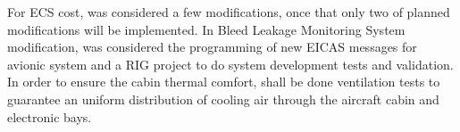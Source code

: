 For ECS cost, was considered a few modifications, once that only two of planned modifications will be implemented.
In Bleed Leakage Monitoring System modification, was considered the programming of new EICAS messages for avionic system and a RIG project to do system development tests and validation.
In order to ensure the cabin thermal comfort, shall be done ventilation tests to guarantee an uniform distribution of cooling air through the aircraft cabin and electronic bays.
\begin{figure}[H] %
\label{fig:ECSCostSum1}
\end{figure}

\begin{figure}[H] %
\label{fig:ECSCostSum2}
\end{figure}


